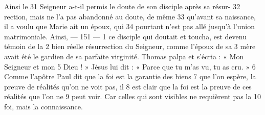 Ainsi le	 
31	 	Seigneur a-t-il permis le doute de son disciple après sa résur-	 
32	 	rection, mais ne l'a pas abandonné au doute, de même	 
33	 	qu'avant sa naissance, il a voulu que Marie ait un époux, qui	 
34	 	pourtant n'est pas allé jusqu'à l'union matrimoniale. Ainsi,	 
 	--- 151 ---	 
1	 	ce disciple qui doutait et toucha, est devenu témoin de la	 
2	 	bien réelle résurrection du Seigneur, comme l'époux de sa	 
3	 	mère avait été le gardien de sa parfaite virginité.
Thomas palpa et s'écria : « Mon Seigneur et mon	 
5	 	Dieu ! » Jésus lui dit : « Parce que tu m'as vu, tu as cru. »	 
6	 	Comme l'apôtre Paul dit que la foi est la garantie des biens	 
7	 	que l'on espère, la preuve de réalités qu'on ne voit pas, il	 
8	 	est clair que la foi est la preuve de ces réalités que l'on ne	 
9	 	peut voir. Car celles qui sont visibles ne requièrent pas la	 
10	 	foi, mais la connaissance.